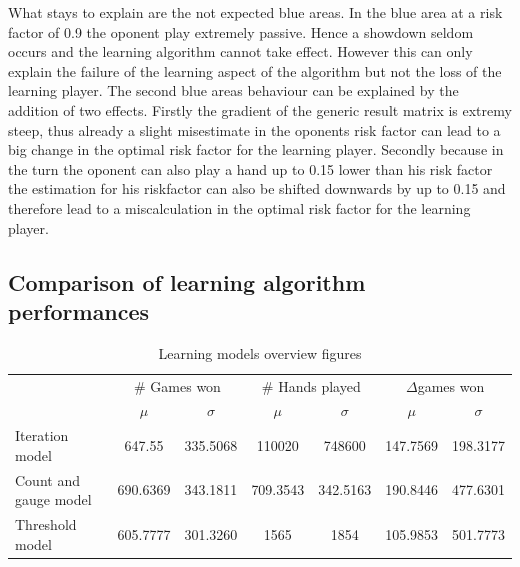 \documentclass[11pt]{article}
\begin{document}
What stays to explain are the not expected blue areas. In the blue area at a risk factor of 0.9 the oponent play extremely passive. Hence a showdown seldom occurs and the learning algorithm cannot take effect. However this can only explain the failure of the learning aspect of the algorithm but not the loss of the learning player. The second blue areas behaviour can be explained by the addition of two effects. Firstly the gradient of the generic result matrix is extremy steep, thus already a slight misestimate in the oponents risk factor can lead to a big change in the optimal risk factor for the learning player. Secondly because in the turn the oponent can also play a hand up to 0.15 lower than his risk factor the estimation for his riskfactor can also be shifted downwards by up to 0.15 and therefore lead to a miscalculation in the optimal risk factor for the learning player.


\subsection{Comparison of learning algorithm performances}


\begin{table}[]
\centering
\caption{Learning models overview figures}


\label{Learning models overview}
\begin{tabular}{lcccccc}
\cline{2-7}
                                           & \multicolumn{2}{c}{\# Games won}                      & \multicolumn{2}{c}{\# Hands played}                   & \multicolumn{2}{c}{$\Delta$games won} \\ \cline{2-7} 
\multicolumn{1}{c|}{}                       & \multicolumn{1}{c|}{$\mu$} & \multicolumn{1}{c|}{$\sigma$} & \multicolumn{1}{c|}{$\mu$} & \multicolumn{1}{c|}{$\sigma$} & \multicolumn{1}{c|}{$\mu$} & $\sigma$ \\ \hline


\multicolumn{1}{l|}{Iteration model}           & 647.55                     & \multicolumn{1}{c|}{335.5068}         & 110020                     & \multicolumn{1}{c|}{748600}   & 147.7569                            & 198.3177        \\ \hline
\multicolumn{1}{l|}{Count and gauge model} & 690.6369                   & \multicolumn{1}{c|}{343.1811} & 709.3543                   & \multicolumn{1}{c|}{342.5163} & 190.8446                   & 477.6301 \\ \hline
\multicolumn{1}{l|}{Threshold model}       & 605.7777                   & \multicolumn{1}{c|}{301.3260} & 1565                       & \multicolumn{1}{c|}{1854}     & 105.9853                   & 501.7773 \\ \hline


\end{tabular}
\end{table}
\end{document}
